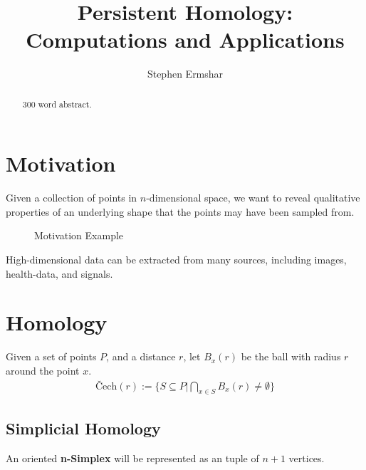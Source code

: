 

\title{Persistent Homology: Computations and Applications}
\author{Stephen Ermshar}
\date{} %



\begin{abstract}
    300 word abstract.
\end{abstract}
\maketitle

\section{Motivation}

Given a collection of points in \(n\)-dimensional space, we want to reveal qualitative properties of an underlying shape that the points may have been sampled from.

\begin{figure}[h!]
    \centering
    
    \caption{Motivation Example}
\end{figure}

High-dimensional data can be extracted from many sources, including images, health-data, and signals.

\section{Homology}

\begin{definition}\label{defcechcomp}
    Given a set of points \(P\), and a distance \(r\), let \(B_x(r)\) be the ball with radius \(r\) around the point \(x\).
    \begin{align*}
        \textrm{\v{C}ech}(r) := \{ S \subseteq P | \bigcap_{x\in S} B_x(r) \neq \emptyset \}
    \end{align*}
    \cite{wagner}
\end{definition}

\subsection{Simplicial Homology}

\begin{definition}
    An oriented \textbf{n-Simplex} will be represented as an tuple of \(n+1\) vertices.
\end{definition}

